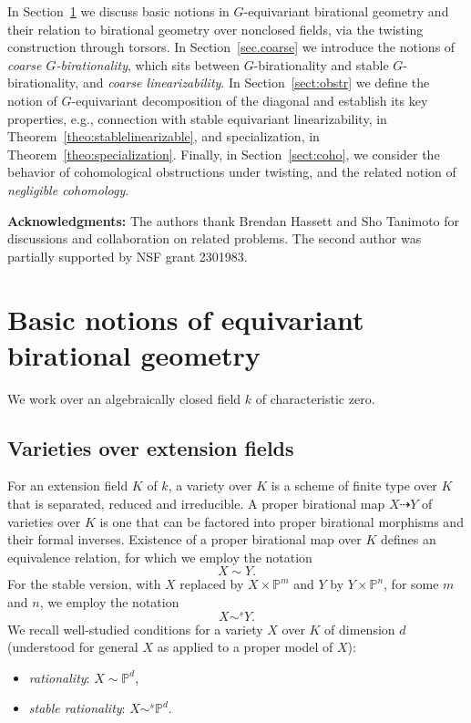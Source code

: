 \documentclass[12pt, reqno]{amsart}
\numberwithin{equation}{section}
\theoremstyle{plain}
\theoremstyle{definition}
\def\bP{{\mathbb P}}
\begin{document}
In Section~\ref{sect:gen} we discuss basic notions in $G$-equivariant birational geometry and their relation to birational geometry over nonclosed fields, via the twisting construction 
through torsors. In Section~\ref{sec.coarse} we introduce the notions of {\em coarse $G$-birationality}, which sits between $G$-birationality and stable $G$-birationality, and \emph{coarse linearizability}. In Section~\ref{sect:obstr} we define the notion of $G$-equivariant decomposition of the diagonal and establish its key properties, e.g., connection with 
stable equivariant linearizability, in Theorem~\ref{theo:stablelinearizable},  and specialization, in Theorem~\ref{theo:specialization}. Finally, in Section~\ref{sect:coho}, we  
consider the behavior of cohomological obstructions under twisting, and the related notion of {\em negligible cohomology}.   

\medskip
\noindent
\textbf{Acknowledgments:}
The authors thank Brendan Hassett and Sho Tanimoto for discussions and collaboration on related problems.
The second author was partially supported by NSF grant 2301983.


\section{Basic notions of equivariant birational geometry}
\label{sect:gen}
We work over an algebraically closed field $k$ of characteristic zero.

\subsection*{Varieties over extension fields}
For an extension field $K$ of $k$,
a variety over $K$ is a scheme of finite type over $K$ that is separated, reduced and irreducible.
A proper birational map $X\dashrightarrow Y$ of varieties over $K$ is one that can be factored into proper birational morphisms and their formal inverses.
Existence of a proper birational map over $K$ defines an equivalence relation, for which we employ the notation
\[ X\sim Y. \]
For the stable version, with $X$ replaced by $X\times \bP^m$ and $Y$ by $Y\times \bP^n$, for some $m$ and $n$, we employ the notation
\[ X\sim^s Y. \]
We recall well-studied conditions for a variety $X$ over $K$ of dimension $d$ (understood for general $X$ as applied to a proper model of $X$):
\begin{itemize}
\item {\em rationality}: 
$X\sim\bP^d$, 
\item {\em stable rationality}: $X\sim^s\bP^d$.
\end{itemize}
\end{document}
